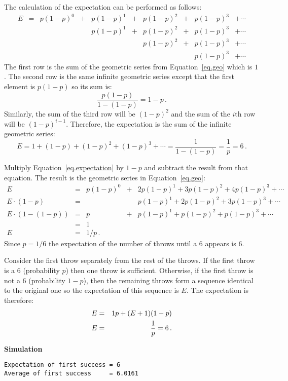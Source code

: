 The calculation of the expectation can be performed as follows:
\[
\begin{array}{llllllllll}
E&=&p(1-p)^0 &+& p(1-p)^1&+& p(1-p)^2&+& p(1-p)^3 &+\cdots \\
& & &&p(1-p)^1&+& p(1-p)^2&+& p(1-p)^3 &+\cdots \\
&  &&&& &p(1-p)^2&+& p(1-p)^3 &+\cdots \\
&&&&&&&&p(1-p)^3 &+\cdots
\end{array}
\]
The first row is the sum of the geometric series from Equation~\ref{eq.geo} which is $1$. The second row is the same infinite geometric series except that the first element is $p(1-p)$ so its sum is:
\[
\frac{p(1-p)}{1-(1-p)}=1-p\,.
\]
Similarly, the sum of the third row will be $(1-p)^2$ and the sum of the $i$th row will be $(1-p)^{i-1}$. Therefore, the expectation is the sum of the infinite geometric series:
\[
E= 1 + (1-p) + (1-p)^2 + (1-p)^3 + \cdots= \frac{1}{1-(1-p)}=\frac{1}{p}=6\,.
\]


Multiply Equation~\ref{eq.expectation} by $1-p$ and subtract the result from that equation. The result is the geometric series in Equation~\ref{eq.geo}:
\[
\begin{array}{rclcl}
E&=&p(1-p)^0 &+&2p(1-p)^1+ 3p(1-p)^2+ 4p(1-p)^3 +\cdots\\
E\cdot(1-p)&=&&&p(1-p)^1 + 2p(1-p)^2+ 3p(1-p)^3 +\cdots \\
E\cdot(1-(1-p)) &=& p &+& p(1-p)^1 + p(1-p)^2 + p(1-p)^3 +\cdots\\
&=&1\\
E&=&1/p\,.
\end{array}
\]
Since $p=1/6$ the expectation of the number of throws until a $6$ appears is $6$.


Consider the first throw separately from the rest of the throws. If the first throw is a $6$ (probability $p$) then one throw is sufficient. Otherwise, if the first throw is not a $6$ (probability $1-p$), then the remaining throws form a sequence identical to the original one so the expectation of this sequence is $E$. The expectation is therefore:
\begin{eqnarray*}
E &=& 1p + (E+1)(1-p)\\
E&=&\displaystyle\frac{1}{p}=6\,.
\end{eqnarray*}

\textbf{Simulation}
\begin{verbatim}
Expectation of first success = 6
Average of first success     = 6.0161
\end{verbatim}

